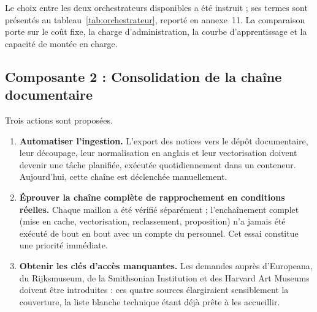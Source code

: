 Le choix entre les deux orchestrateurs disponibles a été instruit ; ses termes
sont présentés au tableau~\ref{tab:orchestrateur}, reporté en annexe~11. La
comparaison porte sur le coût fixe, la charge d'administration, la courbe
d'apprentissage et la capacité de montée en charge.


\subsection{Composante 2 : Consolidation de la chaîne documentaire}

Trois actions sont proposées.

\begin{enumerate}
  \item \textbf{Automatiser l'ingestion.} L'export des notices vers le dépôt
        documentaire, leur découpage, leur normalisation en anglais et leur
        vectorisation doivent devenir une tâche planifiée, exécutée
        quotidiennement dans un conteneur. Aujourd'hui, cette chaîne est
        déclenchée manuellement.

  \item \textbf{Éprouver la chaîne complète de rapprochement en conditions
        réelles.} Chaque maillon a été vérifié séparément ; l'enchaînement
        complet (mise en cache, vectorisation, reclassement, proposition) n'a jamais été exécuté de bout en bout avec un compte du personnel. Cet
        essai constitue une priorité immédiate.

  \item \textbf{Obtenir les clés d'accès manquantes.} Les demandes auprès
        d'Europeana, du Rijksmuseum, de la Smithsonian Institution et des
        Harvard Art Museums doivent être introduites : ces quatre sources
        élargiraient sensiblement la couverture, la liste blanche technique
        étant déjà prête à les accueillir.
\end{enumerate}

